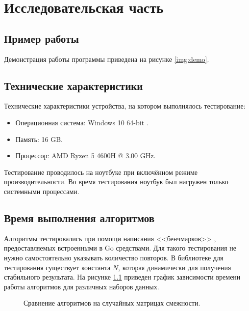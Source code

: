 \chapter{Исследовательская часть}

\section{Пример работы}

Демонстрация работы программы приведена на рисунке \ref{img:demo}.


\section{Технические характеристики}

Технические характеристики устройства, на котором выполнялось тестирование:

\begin{itemize}
	\item Операционная система: Windows 10 64-bit \cite{windows}.
	\item Память: 16 GB.
	\item Процессор: AMD Ryzen 5 4600H \cite{amd} @ 3.00 GHz.
\end{itemize}

Тестирование проводилось на ноутбуке при включённом режиме производительности. Во время тестирования ноутбук был нагружен только системными процессами.

\section{Время выполнения алгоритмов}

Алгоритмы тестировались при помощи написания <<бенчмарков>> \cite{gotest}, предоставляемых встроенными в Go средствами. Для такого  тестирования не нужно самостоятельно указывать количество повторов. В библиотеке для тестирования существует константа $N$, которая динамически для получения стабильного результата. На рисунке \ref{plt:time} приведен график зависимости времени работы алгоритмов для различных наборов данных.

\begin{figure}[!h]
	\centering
	\captionsetup{justification=centering}
	\caption{Сравнение алгоритмов на случайных матрицах смежности.}
	\label{plt:time}
\end{figure}



